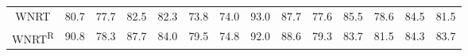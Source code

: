 \begin{table*}[!t]
\begin{tabular}{c|cccccccccccc|c}
        \hline
        WNRT & 80.7 & 77.7 & 82.5 & 82.3 & 73.8 & 74.0 & 93.0 & 87.7 & 77.6 & 85.5 & 78.6 & 84.5 & 81.5 \\
        WNRT\textsuperscript{R} & 90.8 & 78.3 & 87.7 & 84.0 & 79.5 & 74.8 & 92.0 & 88.6 & 79.3 & 83.7 & 81.5 & 84.3 & 83.7 \\
        \hline
    \end{tabular}
\end{table*}